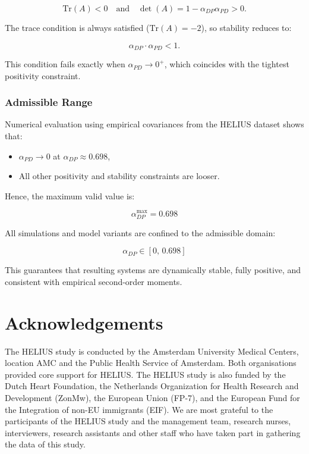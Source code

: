 \documentclass[
]{article}
\providecommand{\tightlist}{%
  \setlength{\itemsep}{0pt}\setlength{\parskip}{0pt}}\usepackage{longtable,booktabs,array}
\begin{document}
\[
\text{Tr}(A) < 0 \quad \text{and} \quad \det(A) = 1 - \alpha_{DP} \alpha_{PD} > 0.
\]

The trace condition is always satisfied (\(\text{Tr}(A) = -2\)), so
stability reduces to:

\[
\alpha_{DP} \cdot \alpha_{PD} < 1.
\]

This condition fails exactly when \(\alpha_{PD} \to 0^+\), which
coincides with the tightest positivity constraint.

\subsubsection{Admissible Range}\label{admissible-range}

Numerical evaluation using empirical covariances from the HELIUS dataset
shows that:

\begin{itemize}
\tightlist
\item
  \(\alpha_{PD} \to 0\) at \(\alpha_{DP} \approx 0.698\),
\item
  All other positivity and stability constraints are looser.
\end{itemize}

Hence, the maximum valid value is:

\[
\boxed{\alpha_{DP}^{\max} = 0.698}
\]

All simulations and model variants are confined to the admissible
domain:

\[
\alpha_{DP} \in [0,\, 0.698]
\]

This guarantees that resulting systems are dynamically stable, fully
positive, and consistent with empirical second-order moments.

\section*{Acknowledgements}\label{acknowledgements}

The HELIUS study is conducted by the Amsterdam University Medical
Centers, location AMC and the Public Health Service of Amsterdam. Both
organisations provided core support for HELIUS. The HELIUS study is also
funded by the Dutch Heart Foundation, the Netherlands Organization for
Health Research and Development (ZonMw), the European Union (FP-7), and
the European Fund for the Integration of non-EU immigrants (EIF). We are
most grateful to the participants of the HELIUS study and the management
team, research nurses, interviewers, research assistants and other staff
who have taken part in gathering the data of this study.
\end{document}
